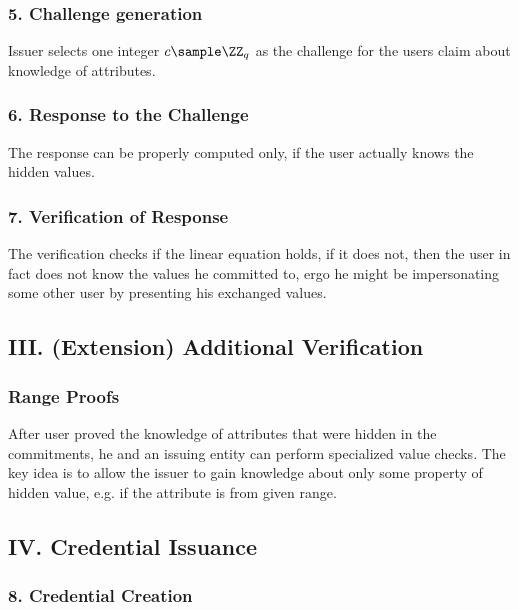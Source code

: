 \subsubsection*{5. Challenge generation}
Issuer selects one integer $c \sample \ZZ_q$ as the challenge for the users claim about knowledge of attributes.

\subsubsection*{6. Response to the Challenge}
The response can be properly computed only, if the user actually knows the hidden values.

\subsubsection*{7. Verification of Response}
The verification checks if the linear equation holds, if it does not, then the user in fact does not know the values he committed to, ergo he might be impersonating some other user by presenting his exchanged values.





\subsection*{III. (Extension) Additional Verification}
\subsubsection*{Range Proofs}

After user proved the knowledge of attributes that were hidden in the commitments, he and an issuing entity can perform specialized value checks. The key idea is to allow the issuer to gain knowledge about only some property of hidden value, e.g. if the attribute is from given range.


\subsection*{IV. Credential Issuance}

\subsubsection*{8. Credential Creation}

